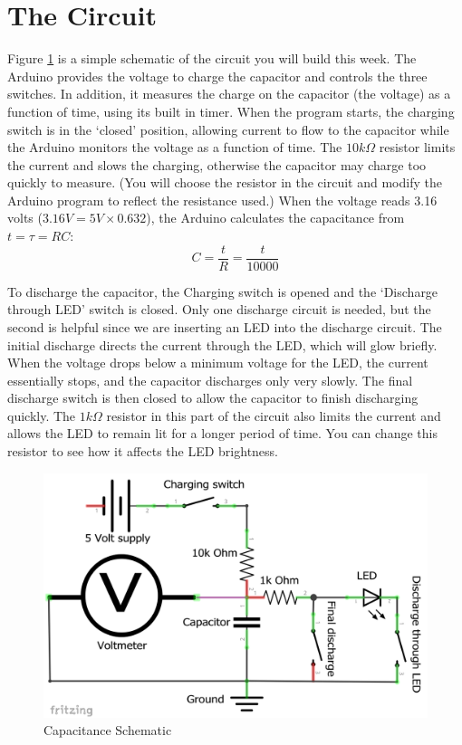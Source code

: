 \documentclass[]{article}
\begin{document}
\section{The Circuit}

Figure \ref{cap} is a simple schematic of the circuit you will build this week.  The Arduino provides the voltage to charge the capacitor and controls the three switches.  In addition, it measures the charge on the capacitor (the voltage) as a function of time, using its built in timer.  When the program starts, the charging switch is in the `closed' position, allowing current to flow to the capacitor while the Arduino monitors the voltage as a function of time.  The $10k \Omega$ resistor limits the current and slows the charging, otherwise the capacitor may charge too quickly to measure. (You will choose the resistor in the circuit and modify the Arduino program to reflect the resistance used.) When the voltage reads 3.16 volts ($3.16 V = 5 V \times 0.632$), the Arduino calculates the capacitance from $t=\tau=RC$: 
\begin{equation*}
C=\frac{t}{R}=\frac{t}{10000} 
\end{equation*}

To discharge the capacitor, the Charging switch is opened and the `Discharge through LED' switch is closed.  Only one discharge circuit is needed, but the second is helpful since we are inserting an LED into the  discharge circuit.  The initial discharge directs the current through the LED, which will glow briefly.  When the voltage drops below a minimum voltage for the LED, the current essentially stops, and the capacitor discharges only very slowly.  The final discharge switch is then closed to allow the capacitor to finish discharging quickly.  The $1k \Omega$ resistor in this part of the circuit also limits the current and  allows the LED to remain lit for a longer period of time.  You can change this resistor to see how it affects the LED brightness.



\begin{figure}[h]
	\centering
	\includegraphics[width=12cm]{pics/Schematic.png}
	\caption{Capacitance Schematic}
	\label{cap}
\end{figure}
\end{document}
